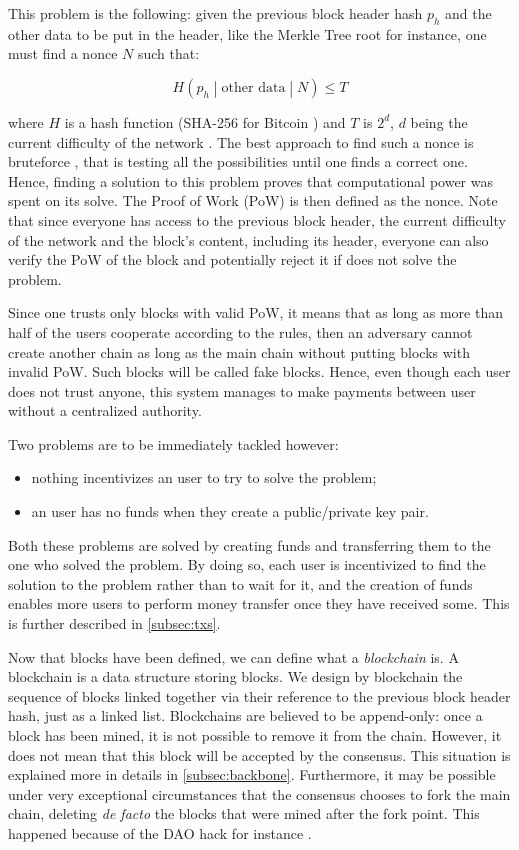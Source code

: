         This problem is the following: given the previous block header hash \(p_h\) and the other data to be put in the header, like the Merkle Tree root for instance, one must find a nonce \(N\) such that:
        
        \[H\left(p_h\middle|\text{other data}\middle|N\right)\leqslant T\]
        
        where \(H\) is a hash function (SHA-256 for Bitcoin \cite{SoK}) and \(T\) is \(2^{d}\), \(d\) being the current difficulty of the network \cite{PoDL}. The best approach to find such a nonce is bruteforce \cite{PoDL}, that is testing all the possibilities until one finds a correct one. Hence, finding a solution to this problem proves that computational power was spent on its solve. The Proof of Work (PoW) is then defined as the nonce. Note that since everyone has access to the previous block header, the current difficulty of the network and the block's content, including its header, everyone can also verify the PoW of the block and potentially reject it if does not solve the problem.
        
        Since one trusts only blocks with valid PoW, it means that as long as more than half of the users cooperate according to the rules, then an adversary cannot create another chain as long as the main chain without putting blocks with invalid PoW. Such blocks will be called fake blocks. Hence, even though each user does not trust anyone, this system manages to make payments between user without a centralized authority.
        
        Two problems are to be immediately tackled however:
        
        \begin{itemize}
          \item nothing incentivizes an user to try to solve the problem;
          \item an user has no funds when they create a public/private key pair.
        \end{itemize}
        
        Both these problems are solved by creating funds and transferring them to the one who solved the problem. By doing so, each user is incentivized to find the solution to the problem rather than to wait for it, and the creation of funds enables more users to perform money transfer once they have received some. This is further described in \autoref{subsec:txs}.
        
        Now that blocks have been defined, we can define what a \textit{blockchain} is. A blockchain is a data structure storing blocks. We design by blockchain the sequence of blocks linked together via their reference to the previous block header hash, just as a linked list. Blockchains are believed to be append-only: once a block has been mined, it is not possible to remove it from the chain. However, it does not mean that this block will be accepted by the consensus. This situation is explained more in details in \autoref{subsec:backbone}. Furthermore, it may be possible under very exceptional circumstances that the consensus chooses to fork the main chain, deleting \textit{de facto} the blocks that were mined after the fork point. This happened because of the DAO hack for instance \cite{DAO}.
      
